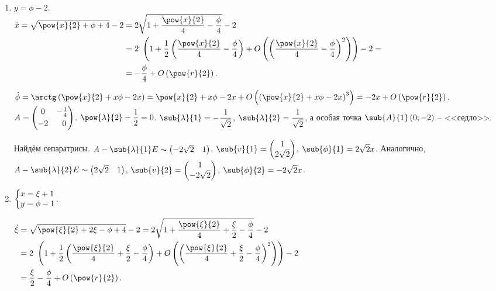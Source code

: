 \documentclass[a5paper,10pt]{article}
\begin{document}
\begin{enumerate}
    \item $y = \phi - 2$. \\
        $\begin{aligned}
        \dot{x} = \sqrt{\pow{x}{2} + \phi + 4} - 2
        & = 2\sqrt{1 + \dfrac {\pow{x}{2}} {4} - \dfrac {\phi} {4}} - 2 \\
        & = 2\ \br{1 + \dfrac {1} {2} \br{\dfrac {\pow{x}{2}} {4} - \dfrac {\phi} {4}} 
            + O\br{\br{\dfrac {\pow{x}{2}} {4} - \dfrac {\phi} {4}}^2}} - 2 = \\
        & = - \dfrac {\phi} {4} + O\br{\pow{r}{2}}.
    \end{aligned}$
    
    $\dot{\phi} = \arctg\br{\pow{x}{2} + x\phi - 2x} 
    = \pow{x}{2} + x\phi - 2x + O\br{\br{\pow{x}{2} + x\phi - 2x}^3} 
    = -2x + O\br{\pow{r}{2}}$.
    $A = \begin{pmatrix} 0 & - \frac {1} {4} \vspace{1mm}  \\ -2 & \hspace{2mm} 0 \end{pmatrix}$.
    $\pow{\lambda}{2} - \dfrac {1} {2} = 0$.
    $\sub{\lambda}{1} = -\dfrac {1} {\sqrt{2}}$,
    $\sub{\lambda}{2} = \dfrac {1} {\sqrt{2}}$,
    а особая точка $\sub{A}{1}\br{0; -2}$ -- <<седло>>.
    
    Найдём сепаратрисы. 
    $A - \sub{\lambda}{1} E \sim \begin{pmatrix} -2\sqrt{2} & 1\end{pmatrix}$,
    $\sub{v}{1} = \begin{pmatrix} 1 \\ 2\sqrt{2} \end{pmatrix}$,
    $\sub{\phi}{1} = 2\sqrt{2} x$.
    Аналогично,
    $A - \sub{\lambda}{2} E \sim \begin{pmatrix} 2\sqrt{2} & 1\end{pmatrix}$,
    $\sub{v}{2} = \begin{pmatrix} 1 \\ -2\sqrt{2} \end{pmatrix}$,
    $\sub{\phi}{2} = -2\sqrt{2} x$.
    \pagebreak
    
    \item $\tsys{
        x = \xi + 1 \\
        y = \phi - 1
    }$.
    
    $\begin{aligned}
        \dot{\xi} 
        & = \sqrt{\pow{\xi}{2} + 2\xi - \phi + 4} - 2
        = 2\sqrt{1 + \dfrac {\pow{\xi}{2}} {4} + \dfrac {\xi} {2} - \dfrac {\phi} {4}} - 2 \\
        & = 2\ \br{1 + \dfrac {1}{2} 
            \br{\dfrac {\pow{\xi}{2}} {4} + \dfrac {\xi} {2} - \dfrac {\phi} {4} } 
            + O\br{\br{\dfrac {\pow{\xi}{2}} {4} + \dfrac {\xi} {2} - \dfrac {\phi} {4}}^2} }
            - 2 \\
        & = \dfrac {\xi} {2} - \dfrac {\phi} {4} + O\br{\pow{r}{2}}.\end{aligned}$
    

\end{enumerate}
\end{document}
